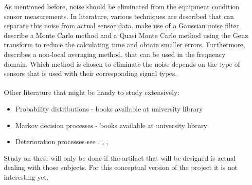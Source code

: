 As mentioned before, noise should be eliminated from the equipment condition sensor measurements. In literature, various techniques are described that can separate this noise from actual sensor data. \citet{LESON2016} make use of a Gaussian noise filter, \citet{KALLEN2005} describe a Monte Carlo method and \citet{LU2013} a Quasi Monte Carlo method using the Genz transform to reduce the calculating time and obtain smaller errors. Furthermore, \citet{Bourdin2011} describes a non-local averaging method, that can be used in the frequency domain. Which method is chosen to eliminate the noise depends on the type of sensors that is used with their corresponding signal types. \\ \\
Other literature that might be handy to study extensively: 
\begin{itemize}
\item Probability distributions - books available at university library
\item Markov decision processes - books available at university library
\item Deterioration processes see \parencite{CHEN2015}, \parencite{Do2015}, \parencite{JARDINE2006}, \parencite{Sloan2000}
\end{itemize}
Study on these will only be done if the artifact that will be designed is actual dealing with those subjects. For this conceptual version of the project it is not interesting yet. 

